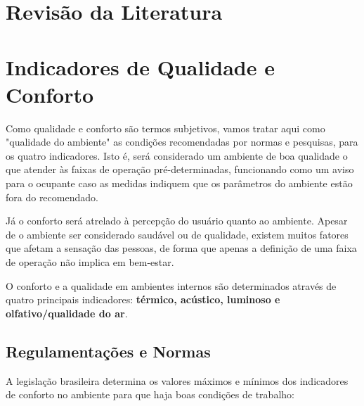 \documentclass[../monografia.tex]{subfiles}
\begin{document}
\section{Revisão da Literatura} 

\section{Indicadores de Qualidade e Conforto} 


Como qualidade e conforto são termos subjetivos, vamos tratar aqui como "qualidade do ambiente" as condições recomendadas por normas e pesquisas, para os quatro indicadores. Isto é, será considerado um ambiente de boa qualidade o que atender às faixas de operação pré-determinadas, funcionando como um aviso para o ocupante caso as medidas indiquem que os parâmetros do ambiente estão fora do recomendado. 

Já o conforto será atrelado à percepção do usuário quanto ao ambiente. Apesar de o ambiente ser considerado saudável ou de qualidade, existem muitos fatores que afetam a sensação das pessoas, de forma que apenas a definição de uma faixa de operação não implica em bem-estar. 

O conforto e a qualidade em ambientes internos são determinados através de quatro principais indicadores: \textbf{térmico, acústico, luminoso e olfativo/qualidade do ar}\cite{ComfortBox}. 

\subsection{Regulamentações e Normas} %

A legislação brasileira determina os valores máximos e mínimos dos indicadores de conforto no ambiente para que haja boas condições de trabalho: 
\end{document}
